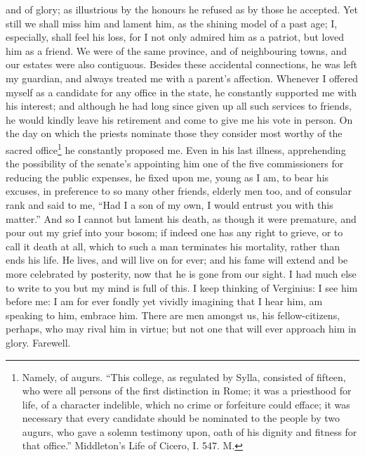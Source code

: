 and of glory; as illustrious by the honours he refused as by those he
accepted. Yet still we shall miss him and lament him, as the shining model
of a past age; I, especially, shall feel his loss, for I not only admired
him as a patriot, but loved him as a friend. We were of the same province,
and of neighbouring towns, and our estates were also contiguous. Besides
these accidental connections, he was left my guardian, and always treated
me with a parent's affection. Whenever I offered myself as a candidate for
any office in the state, he constantly supported me with his interest; and
although he had long since given up all such services to friends, he would
kindly leave his retirement and come to give me his vote in person. On
the day on which the priests nominate those they consider most worthy of
the sacred office\footnote{Namely, of augurs. ``This
college, as regulated by Sylla, consisted of fifteen, who were all persons
of the first distinction in Rome; it was a priesthood for life, of a
character indelible, which no crime or forfeiture could efface; it was
necessary that every candidate should be nominated to the people by two
augurs, who gave a solemn testimony upon, oath of his dignity and fitness
for that office.'' Middleton's Life of Cicero, I. 547. M.} he constantly proposed me. Even in his last
illness, apprehending the possibility of the senate's appointing him one
of the five commissioners for reducing the public expenses, he fixed upon
me, young as I am, to bear his excuses, in preference to so many other
friends, elderly men too, and of consular rank and said to me, ``Had I a
son of my own, I would entrust you with this matter.'' And so I cannot but
lament his death, as though it were premature, and pour out my grief into
your bosom; if indeed one has any right to grieve, or to call it death at
all, which to such a man terminates his mortality, rather than ends his
life. He lives, and will live on for ever; and his fame will extend and be
more celebrated by posterity, now that he is gone from our sight. I had
much else to write to you but my mind is full of this. I keep thinking of
Verginius: I see him before me: I am for ever fondly yet vividly imagining
that I hear him, am speaking to him, embrace him. There are men amongst
us, his fellow-citizens, perhaps, who may rival him in virtue; but not one
that will ever approach him in glory. Farewell.


